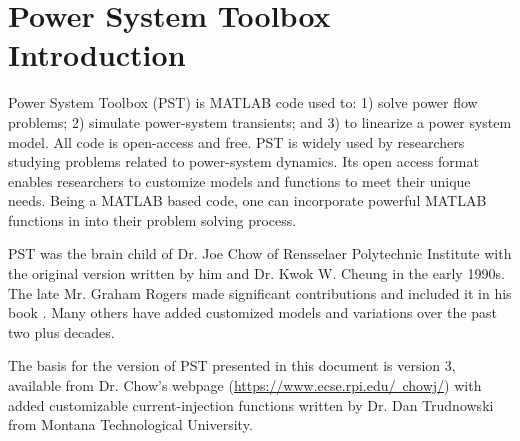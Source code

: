 \vspace{2em} %
\chapter*{Power System Toolbox Introduction}


Power System Toolbox (PST) is MATLAB code used to: 1) solve power flow problems; 2) simulate power-system transients; and 3) to linearize a power system model.  All code is open-access and free.  PST is widely used by researchers studying problems related to power-system dynamics.  Its open access format enables researchers to customize models and functions to meet their unique needs.  Being a MATLAB based code, one can incorporate powerful MATLAB functions in into their problem solving process.

\vspace{1em}
PST was the brain child of Dr. Joe Chow of Rensselaer Polytechnic Institute with the original version written by him and Dr. Kwok W. Cheung in the early 1990s.  The late Mr. Graham Rogers made significant contributions and included it in his book \cite{rogers1999}.  Many others have added customized models and variations over the past two plus decades. 

\vspace{1em}
The basis for the version of PST presented in this document is version 3, available from Dr. Chow’s webpage (\href{https://www.ecse.rpi.edu/~chowj/}{https://www.ecse.rpi.edu/~chowj/}) with added customizable current-injection functions written by Dr. Dan Trudnowski from Montana Technological University.